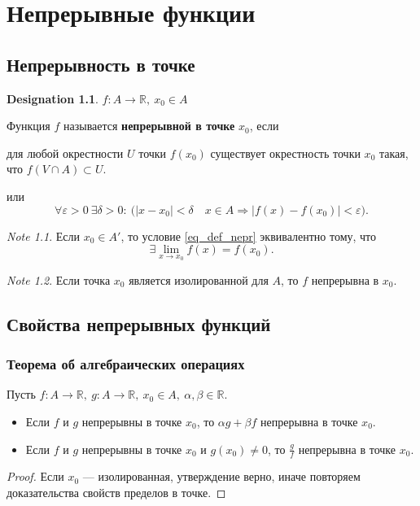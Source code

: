 \documentclass[11pt]{book}
\newcommand{\R}{\mathbb{R}}
\theoremstyle{definition}
\theoremstyle{plain}
\theoremstyle{plain}
\theoremstyle{definition}
\newtheorem*{name}{Designation}
\theoremstyle{remark}
\newtheorem*{note}{Note}
\begin{document}
\chapter{Непрерывные функции}
\section{Непрерывность в точке}
\begin{name}
    $ f: A \to  \R, ~ x_0 \in  A$
\end{name}
\begin{defn}
    Функция $ f$ называется {\bf непрерывной в точке} $ x_0$, если
    \begin{description}
	\item
	    для любой окрестности $ U$ точки  $ f(x_0)$ существует окрестность точки $ x_0$ такая, что $ f(V \cap A) \subset U$.
	\item или
	    \begin{equation}\label{eq_def_nepr}
		\forall \varepsilon >0 ~ \exists \delta >0: ~ \bigl( |x-x_0| < \delta \quad x \in A \Longrightarrow  |f(x) - f(x_0)| < \varepsilon \bigr).
	    \end{equation}
    \end{description}
\end{defn}
\begin{note}
    Если  $ x_0 \in A'$, то условие \ref{eq_def_nepr} эквивалентно тому, что \[
	\exists \lim_{x \to  x_0} f(x) = f(x_0)
    .\]
\end{note}
\begin{note}
    Если точка $ x_0$ является изолированной для $ A$, то  $ f$ непрерывна в $ x_0$.
\end{note}
\section{Свойства непрерывных функций}
\subsection{Теорема об алгебраических операциях}
\begin{thm}
    Пусть $ f: A \to  \R, ~ g : A \to \R, ~ x_0 \in A, ~ \alpha , \beta \in \R$.
    \begin{itemize}
	\item Если $ f$ и  $ g$ непрерывны в точке  $ x_0$, то $ \alpha g + \beta f$ непрерывна в точке $ x_0$.
	\item     Если $ f$ и  $ g$ непрерывны в точке  $ x_0$ и $ g(x_0) \ne 0$, то $\frac{g}{f}$ непрерывна в точке $ x_0$.
    \end{itemize}
\end{thm}
\begin{proof}
    Если $ x_0$ --- изолированная, утверждение верно, иначе повторяем доказательства свойств пределов в точке.
\end{proof}
\end{document}
